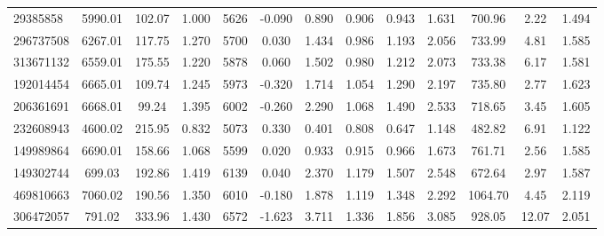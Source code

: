\documentclass[11pt]{article}
\begin{document}
\begin{table}[htbp]
{\begin{tabular}{lcccccccccccc}
 29385858 & 5990.01 & 102.07 & 1.000 & 5626 & -0.090 & 0.890 & 0.906 & 0.943 & 1.631 & 700.96 & 2.22 & 1.494 \\
 296737508 & 6267.01 & 117.75 & 1.270 & 5700 & 0.030 & 1.434 & 0.986 & 1.193 & 2.056 & 733.99 & 4.81 & 1.585 \\
 313671132 & 6559.01 & 175.55 & 1.220 & 5878 & 0.060 & 1.502 & 0.980 & 1.212 & 2.073 & 733.38 & 6.17 & 1.581 \\
 192014454 & 6665.01 & 109.74 & 1.245 & 5973 & -0.320 & 1.714 & 1.054 & 1.290 & 2.197 & 735.80 & 2.77 & 1.623 \\
 206361691 & 6668.01 & 99.24 & 1.395 & 6002 & -0.260 & 2.290 & 1.068 & 1.490 & 2.533 & 718.65 & 3.45 & 1.605 \\
 232608943 & 4600.02 & 215.95 & 0.832 & 5073 & 0.330 & 0.401 & 0.808 & 0.647 & 1.148 & 482.82 & 6.91 & 1.122 \\
 149989864 & 6690.01 & 158.66 & 1.068 & 5599 & 0.020 & 0.933 & 0.915 & 0.966 & 1.673 & 761.71 & 2.56 & 1.585 \\
 149302744 & 699.03 & 192.86 & 1.419 & 6139 & 0.040 & 2.370 & 1.179 & 1.507 & 2.548 & 672.64 & 2.97 & 1.587 \\
 469810663 & 7060.02 & 190.56 & 1.350 & 6010 & -0.180 & 1.878 & 1.119 & 1.348 & 2.292 & 1064.70 & 4.45 & 2.119 \\
 306472057 & 791.02 & 333.96 & 1.430 & 6572 & -1.623 & 3.711 & 1.336 & 1.856 & 3.085 & 928.05 & 12.07 & 2.051 \\        
 \bottomrule
    \end{tabular}
}
\end{table}
\end{document}
